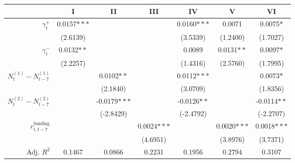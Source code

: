 \begin{tabular}{rSSSSSS}
\toprule
{} &            I &            II &          III &           IV &            V &           VI \\
\midrule
$\gamma^+_t$         &  0.0157$***$ &               &              &  0.0160$***$ &       0.0071 &    0.0075$*$ \\
            &     (2.6139) &               &              &     (3.5339) &     (1.2400) &     (1.7027) \\
$\gamma^-_t$         &   0.0132$**$ &               &              &       0.0089 &   0.0131$**$ &    0.0097$*$ \\
            &     (2.2257) &               &              &     (1.4316) &     (2.5760) &     (1.7995) \\
$N^{(1)}_t - N^{(1)}_{t-7}$ &              &    0.0102$**$ &              &  0.0112$***$ &              &    0.0073$*$ \\
            &              &      (2.1840) &              &     (3.0709) &              &     (1.8356) \\
$N^{(2)}_t - N^{(2)}_{t-7}$ &              &  -0.0179$***$ &              &  -0.0126$**$ &              &  -0.0114$**$ \\
            &              &     (-2.8429) &              &    (-2.4792) &              &    (-2.2707) \\
$r^{\text{funding}}_{t,t-7}$          &              &               &  0.0024$***$ &              &  0.0020$***$ &  0.0018$***$ \\
            &              &               &     (4.6951) &              &     (3.8976) &     (3.7371) \\
\midrule
Adj. $R^2$ & 0.1467 & 0.0866 & 0.2231 & 0.1956 & 0.2794 & 0.3107\\\bottomrule
\end{tabular}
